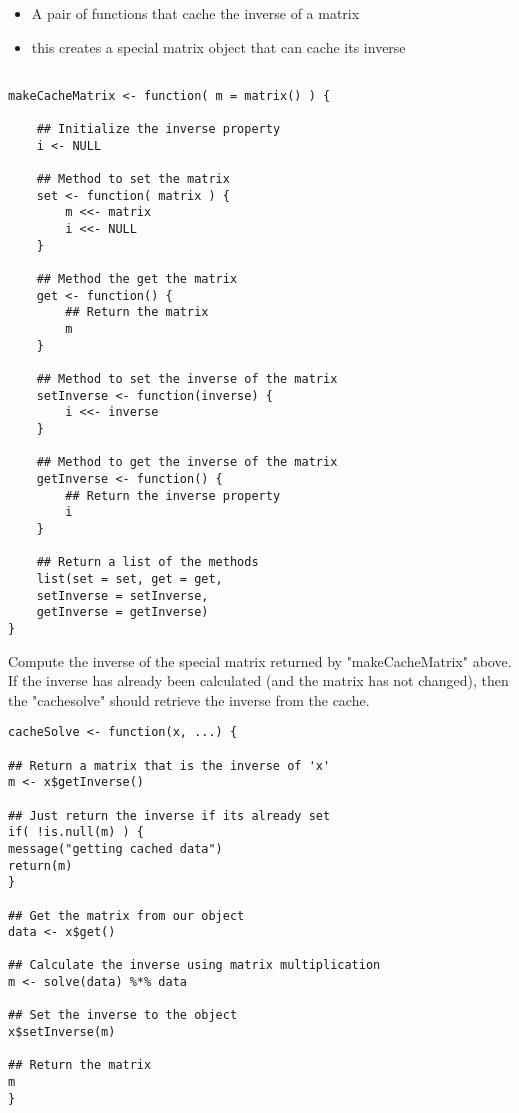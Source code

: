 \documentclass[french]{article}
\begin{document}
	\begin{itemize}
		\item A pair of functions that cache the inverse of a matrix
		
		
		\item this creates a special matrix object that can cache its inverse
	\end{itemize}
\begin{framed}
\begin{verbatim}

makeCacheMatrix <- function( m = matrix() ) {
	
	## Initialize the inverse property
	i <- NULL
	
	## Method to set the matrix
	set <- function( matrix ) {
		m <<- matrix
		i <<- NULL
	}
	
	## Method the get the matrix
	get <- function() {
		## Return the matrix
		m
	}
	
	## Method to set the inverse of the matrix
	setInverse <- function(inverse) {
		i <<- inverse
	}
	
	## Method to get the inverse of the matrix
	getInverse <- function() {
		## Return the inverse property
		i
	}
	
	## Return a list of the methods
	list(set = set, get = get,
	setInverse = setInverse,
	getInverse = getInverse)
}
\end{verbatim}
\end{framed}

\newpage
Compute the inverse of the special matrix returned by "makeCacheMatrix"
above. If the inverse has already been calculated (and the matrix has not
changed), then the "cachesolve" should retrieve the inverse from the cache.

\begin{framed}
\begin{verbatim}
cacheSolve <- function(x, ...) {

## Return a matrix that is the inverse of 'x'
m <- x$getInverse()

## Just return the inverse if its already set
if( !is.null(m) ) {
message("getting cached data")
return(m)
}

## Get the matrix from our object
data <- x$get()

## Calculate the inverse using matrix multiplication
m <- solve(data) %*% data

## Set the inverse to the object
x$setInverse(m)

## Return the matrix
m
}
\end{verbatim}
\end{framed}
\end{document}
